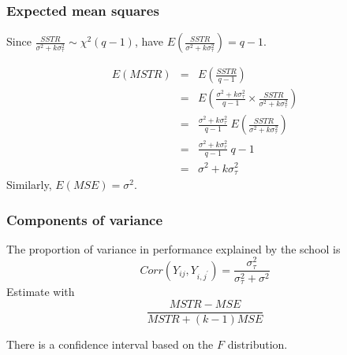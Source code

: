 \documentclass[serif]{beamer} %
\begin{document}
\begin{frame}
\frametitle{Expected mean squares}
Since $\frac{SSTR}{\sigma^2+k\sigma^2_\tau} \sim \chi^2(q-1)$, have
$E\left(\frac{SSTR}{\sigma^2+k\sigma^2_\tau}\right) = q-1$.

\begin{eqnarray*}
   E(MSTR) & = & E\left( \frac{SSTR}{q-1}\right) \\
                & = & E\left( \frac{\sigma^2+k\sigma^2_\tau}{q-1} \times
                          \frac{SSTR}{\sigma^2+k\sigma^2_\tau} \right) \\
                & = &  \frac{\sigma^2+k\sigma^2_\tau}{q-1} ~ E\left(
                          \frac{SSTR}{\sigma^2+k\sigma^2_\tau} \right)
                        \\
                & = &  \frac{\sigma^2+k\sigma^2_\tau}{q-1} ~q-1 \\
                & = &  \sigma^2+k\sigma^2_\tau
\end{eqnarray*} 
Similarly, $E(MSE) = \sigma^2$.
\end{frame}

\begin{frame}
\frametitle{Components of variance}
The proportion of variance in performance explained by the school is
\begin{displaymath}
    Corr(Y_{ij},Y_{i,j^\prime}) = \frac{\sigma^2_\tau}{\sigma^2_\tau+\sigma^2}
\end{displaymath}
Estimate with
\begin{displaymath}
    \frac{MSTR-MSE}{MSTR+(k-1)MSE}
\end{displaymath}

\vspace{5mm}

There is a confidence interval based on the $F$ distribution.
\end{frame}
\end{document}
